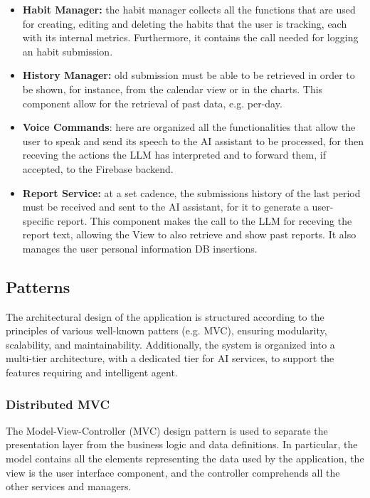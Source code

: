 \documentclass{article}
\begin{document}
\begin{itemize}
    \item \textbf{Habit Manager:} the habit manager collects all the functions that are used for creating, editing and deleting the habits that the user is tracking, each with its internal metrics. Furthermore, it contains the call needed for logging an habit submission.
    \item \textbf{History Manager:} old submission must be able to be retrieved in order to be shown, for instance, from the calendar view or in the charts. This component allow for the retrieval of past data, e.g. per-day.
    \item \textbf{Voice Commands}: here are organized all the functionalities that allow the user to speak and send its speech to the AI assistant to be processed, for then receving the actions the LLM has interpreted and to forward them, if accepted, to the Firebase backend.
    \item \textbf{Report Service:} at a set cadence, the submissions history of the last period must be received and sent to the AI assistant, for it to generate a user-specific report. This component makes the call to the LLM for receving the report text, allowing the View to also retrieve and show past reports. It also manages the user personal information DB insertions.
\end{itemize}

\subsection{Patterns}

The architectural design of the application is structured according to the principles of various well-known patters (e.g. MVC), ensuring modularity, scalability, and maintainability.
Additionally, the system is organized into a multi-tier architecture, with a dedicated tier for AI services, to support the features requiring and intelligent agent.

\subsubsection{Distributed MVC}

The Model-View-Controller (MVC) design pattern is used to separate the presentation layer from the business logic and data definitions.
In particular, the model contains all the elements representing the data used by the application, the view is the user interface component, and the controller comprehends all the other services and managers.
\end{document}
